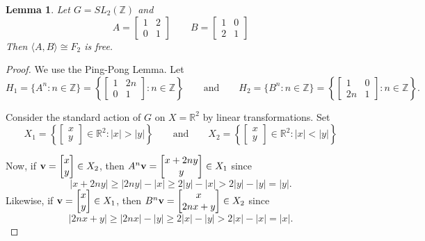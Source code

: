 \documentclass[11pt]{article}
\newtheorem{lemma}{Lemma}[section]
\begin{document}
\begin{lemma}\label{lem:sl2-Z}
	Let $G=SL_2(\mathbb{Z})$ and 
	$$A=\begin{bmatrix}
		1&2\\
		0&1
	\end{bmatrix} \qquad 
	B=\begin{bmatrix}
		1&0\\
		2&1
	\end{bmatrix}$$
	Then $\langle A,B\rangle \cong F_2$ is free.
\end{lemma}

\begin{proof}
	We use the Ping-Pong Lemma. Let 
	$$H_1=\{A^n: n\in \mathbb{Z}\}=\left\lbrace \begin{bmatrix}1&2n\\0&1\end{bmatrix}: n\in\mathbb{Z}\right\rbrace \qquad \text{and} \qquad H_2=\{B^n: n\in \mathbb{Z}\}=\left\lbrace \begin{bmatrix}1&0\\2n&1\end{bmatrix}: n\in\mathbb{Z}\right\rbrace .$$
	
	Consider the standard action of $G$ on $X=\mathbb{R}^2$ by linear transformations. Set 
	$$X_1=\left\lbrace \begin{bmatrix} x\\y \end{bmatrix} \in \mathbb{R}^2 : |x|>|y|\right\rbrace 
	\qquad \text{and}\qquad X_2=\left\lbrace \begin{bmatrix} x\\y \end{bmatrix}\in\mathbb{R}^2: |x|<|y|\right\rbrace$$
	
	\noindent Now, if ${\bf v}=\begin{bmatrix} x\\y \end{bmatrix}\in X_2$, then $A^n{\bf v}=\begin{bmatrix} x+2ny\\y\end{bmatrix}\in X_1$ since
		$$|x+2ny|\geq |2ny|-|x|\geq 2|y|-|x|>2|y|-|y|=|y|.$$
	Likewise, if ${\bf v}=\begin{bmatrix} x\\y \end{bmatrix}\in X_1$, then $B^n{\bf v}=\begin{bmatrix} x\\2nx+y\end{bmatrix}\in X_2$ since
		$$|2nx+y|\geq |2nx|-|y|\geq 2|x|-|y|>2|x|-|x|=|x|.$$
\end{proof}
\end{document}
